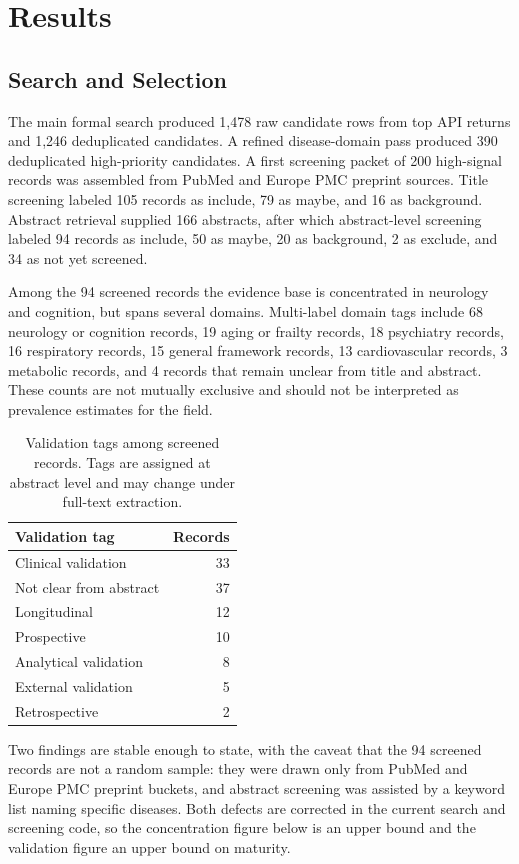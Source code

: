 \documentclass[11pt]{article}
\begin{document}
\section{Results}

\subsection{Search and Selection}

The main formal search produced 1,478 raw candidate rows from top API returns and 1,246 deduplicated candidates. A refined disease-domain pass produced 390 deduplicated high-priority candidates. A first screening packet of 200 high-signal records was assembled from PubMed and Europe PMC preprint sources. Title screening labeled 105 records as include, 79 as maybe, and 16 as background. Abstract retrieval supplied 166 abstracts, after which abstract-level screening labeled 94 records as include, 50 as maybe, 20 as background, 2 as exclude, and 34 as not yet screened.

Among the 94 screened records the evidence base is concentrated in neurology and cognition, but spans several domains. Multi-label domain tags include 68 neurology or cognition records, 19 aging or frailty records, 18 psychiatry records, 16 respiratory records, 15 general framework records, 13 cardiovascular records, 3 metabolic records, and 4 records that remain unclear from title and abstract. These counts are not mutually exclusive and should not be interpreted as prevalence estimates for the field.

\begin{table}[htbp]
\centering
\caption{Validation tags among screened records. Tags are assigned at abstract level and may change under full-text extraction.}
\begin{tabular}{lr}
\toprule
Validation tag & Records \\
\midrule
Clinical validation & 33 \\
Not clear from abstract & 37 \\
Longitudinal & 12 \\
Prospective & 10 \\
Analytical validation & 8 \\
External validation & 5 \\
Retrospective & 2 \\
\bottomrule
\end{tabular}
\end{table}


Two findings are stable enough to state, with the caveat that the 94 screened
records are not a random sample: they were drawn only from
PubMed and Europe PMC preprint buckets, and abstract screening was assisted by a
keyword list naming specific diseases. Both defects are corrected in the current
search and screening code, so the concentration figure below is an upper bound
and the validation figure an upper bound on maturity.
\end{document}
